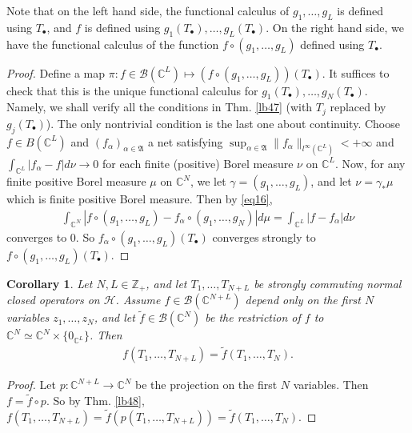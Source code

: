 \documentclass[12pt,b5paper,notitlepage]{article}
\theoremstyle{definition}
\theoremstyle{plain}
\newtheorem{co}[df]{Corollary}
\newcommand{\fk}{\mathfrak}
\newcommand{\mc}{\mathcal}
\newcommand{\wtd}{\widetilde}
\newcommand{\scr}{\mathscr}
\newcommand{\blt}{\bullet}
\newcommand{\Cbb}{\mathbb C}
\newcommand{\Zbb}{\mathbb Z}
\numberwithin{equation}{section}
\begin{document}
Note that on the left hand side, the functional calculus of $g_1,\dots,g_L$ is defined using $T_\blt$, and $f$ is defined using $g_1(T_\blt),\dots,g_L(T_\blt)$. On the right hand side, we have the functional calculus of the function $f\circ(g_1,\dots,g_L)$ defined using $T_\blt$.


\begin{proof}
Define a map $\pi:f\in\scr B(\Cbb^L)\mapsto (f\circ(g_1,\dots,g_L))(T_\blt)$. It suffices to check that this is the unique functional calculus for $g_1(T_\blt),\dots,g_N(T_\blt)$. Namely, we shall verify all the conditions in Thm. \ref{lb47} (with $T_j$ replaced by $g_j(T_\blt)$). The only nontrivial condition is the last one about continuity. Choose $f\in B(\Cbb^L)$ and $(f_\alpha)_{\alpha\in\fk A}$ a net satisfying  $\sup_{\alpha\in\fk A}\lVert f_\alpha\lVert_{l^\infty(\Cbb^L)}<+\infty$ and $\int_{\Cbb^L}|f_\alpha-f|d\nu\rightarrow 0$ for each finite (positive) Borel measure $\nu$ on $\Cbb^L$. Now, for any finite positive Borel measure $\mu$ on $\Cbb^N$, we let $\gamma=(g_1,\dots,g_L)$, and let $\nu=\gamma_*\mu$ which is finite positive Borel measure. Then by \eqref{eq16},
\begin{align*}
\int_{\Cbb^N}|f\circ(g_1,\dots,g_L)-f_\alpha\circ (g_1,\dots,g_N)|d\mu=\int_{\Cbb^L}|f-f_\alpha|d\nu
\end{align*}
converges to $0$. So $f_\alpha\circ(g_1,\dots,g_L)(T_\blt)$ converges strongly to $f\circ(g_1,\dots,g_L)(T_\blt)$.
\end{proof}


\begin{co}\label{lb62}
Let  $N,L\in\Zbb_+$, and let $T_1,\dots,T_{N+L}$ be strongly commuting normal closed operators on $\mc H$.  Assume $f\in\scr B(\Cbb^{N+L})$ depend only on the first $N$ variables $z_1,\dots,z_N$, and let $\wtd f\in\scr B(\Cbb^N)$ be the restriction of $f$ to $\Cbb^N\simeq \Cbb^N\times\{0_{\Cbb^L}\}$. Then
\begin{align*}
f(T_1,\dots,T_{N+L})=\wtd f(T_1,\dots,T_N).	
\end{align*}
\end{co}

\begin{proof}
Let $p:\Cbb^{N+L}\rightarrow\Cbb^N$ be the projection on the first $N$ variables. Then $f=\wtd f\circ p$. So by Thm. \ref{lb48}, $f(T_1,\dots,T_{N+L})=\wtd f(p(T_1,\dots,T_{N+L}))=\wtd f(T_1,\dots,T_N)$.
\end{proof}
\end{document}
